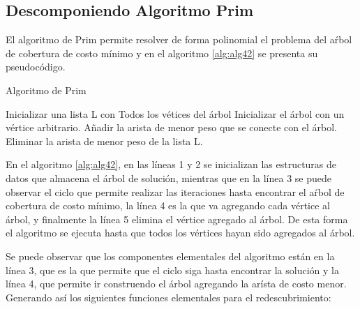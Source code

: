 

\subsection{Descomponiendo Algoritmo Prim}
El algoritmo de Prim permite resolver de forma polinomial el problema del aŕbol de cobertura de costo mínimo y en el algoritmo \ref{alg:alg42} se presenta su pseudocódigo.

\begin{algorithm}[H]
    \caption{Algoritmo de Prim}\label{alg:alg42}
    \begin{algorithmic}[1]
    	\STATE Inicializar una lista L con Todos los vétices del árbol
        \STATE Inicializar el árbol con un vértice arbitrario.
        \STATE Añadir la arista de menor peso que se conecte con el árbol.
        \STATE Eliminar la arista de menor peso de la lista L.
        \ENDWHILE
    \end{algorithmic}
\end{algorithm}

En el algoritmo \ref{alg:alg42}, en las líneas 1 y 2 se inicializan las estructuras de datos que almacena el árbol de solución, mientras que en la línea 3 se puede observar el ciclo que permite realizar las iteraciones hasta encontrar el aŕbol de cobertura de costo mínimo, la línea 4 es la que va agregando cada vértice al árbol, y finalmente la línea 5 elimina el vértice agregado al árbol. De esta forma el algoritmo se ejecuta hasta que todos los vértices hayan sido agregados al árbol.

Se puede observar que los componentes elementales del algoritmo están en la línea 3, que es la que permite que el ciclo siga hasta encontrar la solución y la línea 4, que permite ir construendo el árbol agregando la arísta de costo menor. Generando así los siguientes funciones elementales para el redescubrimiento:

